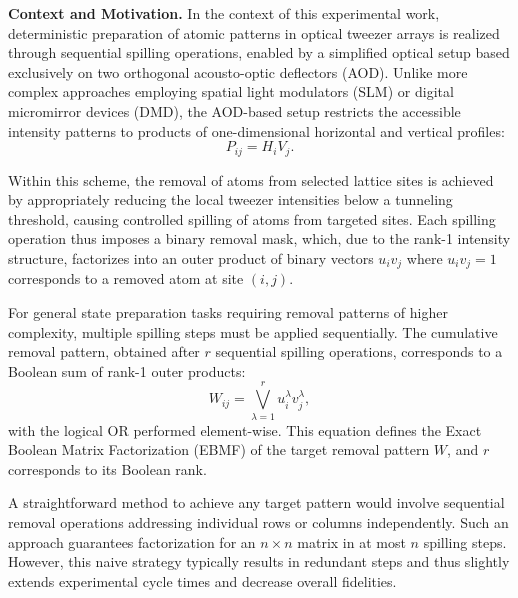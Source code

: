 
\textbf{Context and Motivation.} In the context of this experimental work, deterministic preparation of atomic patterns in optical tweezer arrays is realized through sequential spilling operations, enabled by a simplified optical setup based exclusively on two orthogonal acousto-optic deflectors (AOD). Unlike more complex approaches employing spatial light modulators (SLM) or digital micromirror devices (DMD), the AOD-based setup restricts the accessible intensity patterns to products of one-dimensional horizontal and vertical profiles:
\begin{equation*}
P_{ij} = H_i V_j.
\end{equation*}

Within this scheme, the removal of atoms from selected lattice sites is achieved by appropriately reducing the local tweezer intensities below a tunneling threshold, causing controlled spilling of atoms from targeted sites. Each spilling operation thus imposes a binary removal mask, which, due to the rank-1 intensity structure, factorizes into an outer product of binary vectors $u_i v_j$ where $u_i v_j=1$ corresponds to a removed atom at site $(i,j)$.

For general state preparation tasks requiring removal patterns of higher complexity, multiple spilling steps must be applied sequentially. The cumulative removal pattern, obtained after $r$ sequential spilling operations, corresponds to a Boolean sum of rank-1 outer products:
\begin{equation*}
W_{ij} = \bigvee_{\lambda=1}^{r} u_i^\lambda v_j^\lambda,
\end{equation*}
with the logical OR performed element-wise. This equation defines the Exact Boolean Matrix Factorization (EBMF) of the target removal pattern $W$, and $r$ corresponds to its Boolean rank.

A straightforward method to achieve any target pattern would involve sequential removal operations addressing individual rows or columns independently. Such an approach guarantees factorization for an $n\times n$ matrix in at most $n$ spilling steps. However, this naive strategy typically results in redundant steps and thus slightly extends experimental cycle times and decrease overall fidelities.




